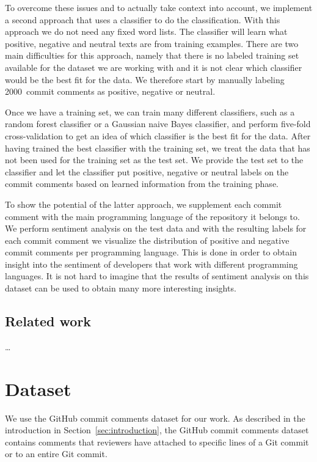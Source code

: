 \documentclass{article}
\begin{document}
To overcome these issues and to actually take context into account, we implement
a second approach that uses a classifier to do the classification. With this
approach we do not need any fixed word lists. The classifier will learn what
positive, negative and neutral texts are from training examples. There are two
main difficulties for this approach, namely that there is no labeled training
set available for the dataset we are working with and it is not clear which
classifier would be the best fit for the data. We therefore start by manually
labeling 2000~commit comments as positive, negative or neutral.

Once we have a training set, we can train many different classifiers, such as 
a random forest classifier or a Gaussian naive Bayes classifier, and perform 
five-fold cross-validation to get an idea of which classifier is the best fit 
for the data. After having trained the best classifier with the training set, 
we treat the data that has not been used for the training set as the test set. 
We provide the test set to the classifier and let the classifier put positive,
negative or neutral labels on the commit comments based on learned information
from the training phase.

To show the potential of the latter approach, we supplement each commit
comment with the main programming language of the repository it belongs to.
We perform sentiment analysis on the test data and with the resulting labels
for each commit comment we visualize the distribution of positive and negative
commit comments per programming language. This is done in order to obtain
insight into the sentiment of developers that work with different programming
languages. It is not hard to imagine that the results of sentiment analysis on
this dataset can be used to obtain many more interesting insights.

\subsection{Related work}\label{sec:relatedwork}
\ldots

\section{Dataset}\label{sec:dataset}
We use the GitHub commit comments dataset for our work. As described in the
introduction in Section~\ref{sec:introduction}, the GitHub commit comments
dataset contains comments that reviewers have attached to specific lines of
a Git commit or to an entire Git commit.
\end{document}

